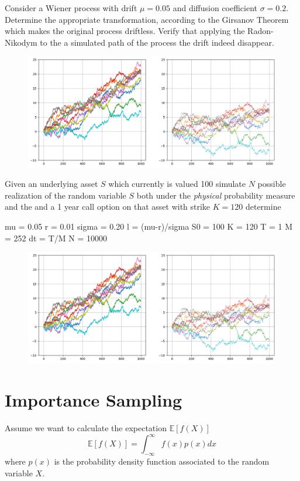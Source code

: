 \documentclass[12pt,a4paper]{article}
\begin{document}
\begin{question}
Consider a Wiener process with drift $\mu=0.05$ and diffusion coefficient $\sigma=0.2$. Determine the appropriate transformation, according to the Girsanov Theorem which makes the original process driftless. Verify that applying the Radon-Nikodym to the a simulated path of the process the drift indeed disappear.

\begin{figure}[htbp]
	\begin{center}
		\includegraphics[width=0.5\linewidth]{addons/brownian_motion_girsanov}
	\end{center}
	\label{fig:brownian_motion_girsanov}
\end{figure}
\end{question}

\begin{question}
Given an underlying asset $S$ which currently is valued 100 simulate $N$ possible realization of the random variable $S$ both under the \emph{physical} probability measure and the 
and a 1 year call option on that asset with strike $K=120$ determine 


mu = 0.05
r = 0.01
sigma = 0.20
l = (mu-r)/sigma
S0 = 100
K = 120
T = 1
M = 252
dt = T/M
N = 10000
\begin{figure}[htbp]
	\begin{center}
		\includegraphics[width=0.5\linewidth]{addons/brownian_motion_girsanov}
	\end{center}
	\label{fig:brownian_motion_girsanov}
\end{figure}
\end{question}

\clearpage
\section{Importance Sampling}
Assume we want to calculate the expectation $\mathbb{E}[f(X)]$
\begin{equation}
\mathbb{E}[f(X)] = \int_{-\infty}^\infty f(x)p(x)dx
\end{equation}
where $p(x)$ is the probability density function associated to the random variable $X$.
\end{document}
